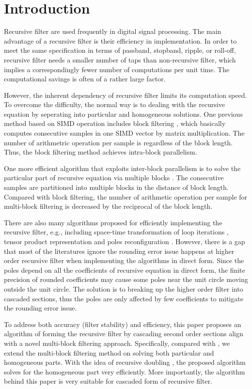 \section{Introduction}
\label{sec:introduction}

Recursive filter are used frequently in digital signal processing.
The main advantage of a recursive filter is their efficiency in implementation.
In order to meet the same specification in terms of passband, stopband, ripple, or roll-off,
recursive filter needs a smaller number of taps than non-recursive filter, which implies
a correspondingly fewer number of computations per unit time. 
The computational savings is often of a rather large factor.

However,
the inherent dependency of recursive filter limits its computation speed.
To overcome the difficulty, the normal way is to dealing with the recursive equation by seperating into
particular and homogeneous solutions.
One previous method based on SIMD operation includes block filtering \cite{Sung_86}, 
which basically computes consecutive samples in one SIMD vector by matrix multiplication. 
The number of arithmetric operation per sample is regardless of the block length. Thus, the block filtering method achieves
intra-block parallelism. 

One more efficient algorithm that exploits inter-block parallelism is to solve the particular part of recursive equation via multiple blocks \cite{Jaewoo_09}.
The consecutive samples are partitioned into multiple blocks in the distance of block length.
Compared with block filtering, the number of arithmetic operation per sample for multi-block filtering is decreased 
by the reciprocal of the block length. 

There are also many algorithms proposed for efficiently implementing the recursive filter, e.g., including
space-time transformation of loop iterations \cite{Schaffer_03}, tensor product representation \cite{Robelly_04} and
poles reconfiguration \cite{Liu_16}.
However, there is a gap that most of the literatures ignore the rounding error issue \cite{Christoph_97} happens at higher order recursive filter when implementing the algorithms in direct form.
Since the poles depend on all the coefficients of recursive equation in direct form, the finite precision of rounded coefficients may cause some poles near the unit circle
moving outside the unit circle. The solution is to breaking up the higher order filter into cascaded sections, thus the poles are only affected by few coefficients to mitigate
the rounding error issue.

To address both accuracy (filter stability) and efficiency, 
this paper proposes an algorithm of forming the recursive filter by cascading second order sections
align with a novel multi-block filtering approach.
Specifically, compared with \cite{Jaewoo_09}, we extend the multi-block filtering method on solving both particular and homogeneous parts. With the idea of recursive doubling \cite{Kogge_73},
the proposed algorithm solves for the homogeneous part very efficiently. More importantly, the algorithm behind this paper is very suitable for cascaded form of recursive filter.


